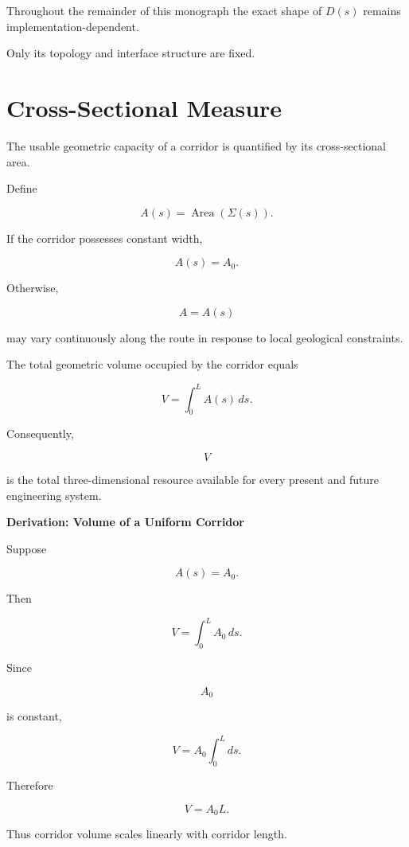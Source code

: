 \documentclass[11pt,fleqn]{book}
\numberwithin{equation}{chapter}
\newenvironment{derivation}[1]
  {\begin{derivationEnv}
   \noindent\textbf{Derivation: #1}\par\smallskip}
  {\end{derivationEnv}}
\theoremstyle{plain}
\theoremstyle{definition}
\theoremstyle{remark}
\begin{document}
Throughout the remainder of this monograph the exact shape of
\(D(s)\) remains implementation-dependent.

Only its topology and interface structure are fixed.


\section{Cross-Sectional Measure}

The usable geometric capacity of a corridor is quantified by its
cross-sectional area.

Define

\[
A(s)
=
\operatorname{Area}
(
\Sigma(s)
).
\]

If the corridor possesses constant width,

\[
A(s)=A_0.
\]

Otherwise,

\[
A=A(s)
\]

may vary continuously along the route in response to local geological
constraints.


The total geometric volume occupied by the corridor equals

\[
V
=
\int_0^L
A(s)\,ds.
\]

Consequently,

\[
V
\]

is the total three-dimensional resource available for every present and
future engineering system.


\begin{derivation}{Volume of a Uniform Corridor}

Suppose

\[
A(s)=A_0.
\]

Then

\[
V
=
\int_0^L
A_0\,ds.
\]

Since

\[
A_0
\]

is constant,

\[
V
=
A_0
\int_0^Lds.
\]

Therefore

\[
\boxed{
V=A_0L.
}
\]

Thus corridor volume scales linearly with corridor length.

\end{derivation}
\end{document}
